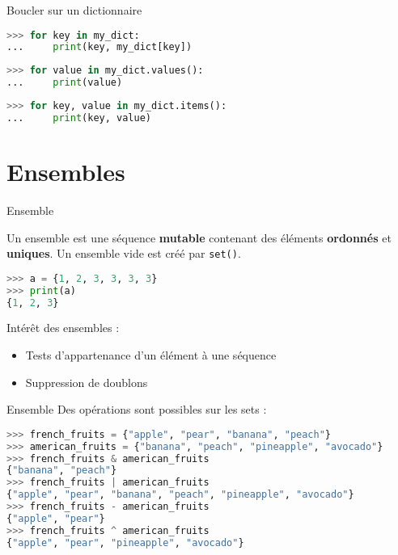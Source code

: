 \begin{frame}[fragile]{Boucler sur un dictionnaire}
\begin{lstlisting}[language=Python, morekeywords={True, false}, numbers=none]
>>> for key in my_dict:
...     print(key, my_dict[key])
\end{lstlisting}
    
\begin{lstlisting}[language=Python, morekeywords={True, false}, numbers=none]
>>> for value in my_dict.values():
...     print(value)
\end{lstlisting}
        
\begin{lstlisting}[language=Python, morekeywords={True, false}, numbers=none]
>>> for key, value in my_dict.items():
...     print(key, value)
\end{lstlisting}
\end{frame}



\section{Ensembles}

\begin{frame}[fragile]{Ensemble}

  Un ensemble est une séquence \textbf{mutable} contenant des éléments \textbf{ordonnés} et \textbf{uniques}. Un ensemble vide est créé par \texttt{set()}.

  \begin{lstlisting}[language=Python, morekeywords={True, false}, numbers=none]
>>> a = {1, 2, 3, 3, 3, 3}
>>> print(a)
{1, 2, 3}
\end{lstlisting}

  Intérêt des ensembles :
  \begin{itemize}
    \item Tests d'appartenance d'un élément à une séquence
    \item Suppression de doublons
  \end{itemize}

\end{frame}

\begin{frame}[fragile]{Ensemble}
Des opérations sont possibles sur les sets :
\begin{lstlisting}[language=Python, morekeywords={&, |, -, ^}, numbers=none]
>>> french_fruits = {"apple", "pear", "banana", "peach"}
>>> american_fruits = {"banana", "peach", "pineapple", "avocado"}
>>> french_fruits & american_fruits
{"banana", "peach"}
>>> french_fruits | american_fruits
{"apple", "pear", "banana", "peach", "pineapple", "avocado"}
>>> french_fruits - american_fruits
{"apple", "pear"}
>>> french_fruits ^ american_fruits
{"apple", "pear", "pineapple", "avocado"}
\end{lstlisting}

\end{frame}

